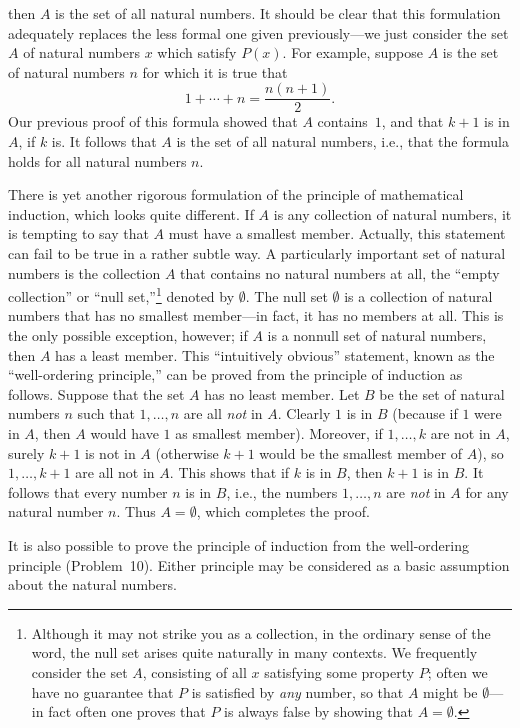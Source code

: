 then $A$ is the set of all natural numbers. It should be clear that this
formulation adequately replaces the less formal one given previously---we just
consider the set $A$ of natural numbers $x$ which satisfy $P(x)$. For example,
suppose $A$ is the set of natural numbers $n$ for which it is true that
\[
1 + \cdots + n = \frac{n(n+1)}{2}.
\]
Our previous proof of this formula showed that $A$ contains~$1$, and that
$k+1$ is in $A$, if $k$ is. It follows that $A$ is the set of all natural
numbers, i.e., that the formula holds for all natural numbers $n$.

There is yet another rigorous formulation of the principle of mathematical
induction, which looks quite different. If $A$ is any collection of natural
numbers, it is tempting to say that $A$ must have a smallest member.
Actually, this statement can fail to be true in a rather subtle way. A
particularly important set of natural numbers is the collection $A$ that
contains no natural numbers at all, the ``empty collection'' or ``null
set,''\footnote{Although it may not strike you as a collection, in the
ordinary sense of the word, the null set arises quite naturally in many
contexts. We frequently consider the set $A$, consisting of all $x$ satisfying
some property $P$; often we have no guarantee that $P$ is satisfied by
\emph{any} number, so that $A$ might be $\emptyset$---in fact often one proves
that $P$ is always false by showing that $A = \emptyset$.}
denoted by $\emptyset$. The null set $\emptyset$ is a collection of natural
numbers that has no smallest member---in fact, it has no members at all. This
is the only possible exception, however; if $A$ is a nonnull set of natural
numbers, then $A$ has a least member. This ``intuitively obvious'' statement,
known as the ``well-ordering principle,'' can be proved from the principle of
induction as follows. Suppose that the set $A$ has no least member. Let $B$ be
the set of natural numbers $n$ such that $1, \dots, n$ are all \emph{not} in
$A$. Clearly $1$ is in $B$ (because if $1$ were in $A$, then $A$ would have $1$
as smallest member). Moreover, if $1, \dots, k$ are not in $A$, surely $k+1$
is not in $A$ (otherwise $k+1$ would be the smallest member of $A$), so
$1, \dots, k+1$ are all not in $A$. This shows that if $k$ is in $B$, then
$k+1$ is in $B$. It follows that every number $n$ is in $B$, i.e., the numbers
$1, \dots, n$ are \emph{not} in $A$ for any natural number $n$. Thus
$A = \emptyset$, which completes the proof.

It is also possible to prove the principle of induction from the well-ordering
principle (Problem~10). Either principle may be considered as a basic
assumption about the natural numbers.

